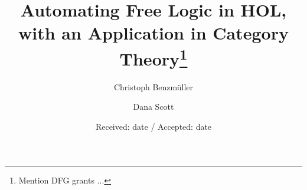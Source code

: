 \newcommand{\imp}{\longrightarrow}
\newcommand{\limp}{\longleftarrow}
\newcommand{\biimp}{\longleftrightarrow}
\newcommand{\allq}{\forall}
\newcommand{\exq}{\exists}
\newcommand{\seq}{\vdash}
\newcommand{\nec}{\Box} %
\newcommand{\pos}{\Diamond} %
\newcommand{\ess}[2]{#1 \ \mathit{ess.} \ #2}
\newcommand{\NE}{\mathit{NE}}


\def\ti{i}
\def\dom{\textit{dom \/}}
\def\cod{\textit{cod \/}}
\def\comp{\cdot}
\def\kleq{\cong}
\def\exid{\simeq}
\def\ddef{:=}
\def\id{\textit{I\/}}
\def\ex{\E}




\title{Automating Free Logic in HOL, with an Application in Category Theory\thanks{Mention DFG grants ...}}


\author{Christoph Benzm\"uller       \and
      Dana Scott 
}



\date{Received: date / Accepted: date}


\maketitle

